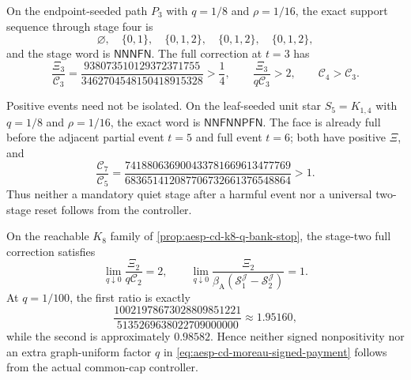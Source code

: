 \begin{proposition}
\label{prop:aesp-cd-p3-positive-signed-event}
On the endpoint-seeded path $P_3$ with $q=1/8$ and $\rho=1/16$, the exact
support sequence through stage four is
\begin{equation*}
 \varnothing,\quad\{0,1\},\quad\{0,1,2\},\quad
 \{0,1,2\},\quad\{0,1,2\},
\end{equation*}
and the stage word is $\mathsf N\mathsf N\mathsf N\mathsf F\mathsf N$.
The full correction at $t=3$ has
\begin{equation}
 \frac{\Xi_3}{\mathcal C_3}
 =\frac{938073510129372371755}{3462704548150418915328}
 >\frac14,
 \qquad
 \frac{\Xi_3}{q\mathcal C_3}>2,
 \qquad
 \mathcal C_4>\mathcal C_3.
 \label{eq:aesp-cd-p3-positive-signed-event}
\end{equation}

Positive events need not be isolated.  On the leaf-seeded unit star
$S_5=K_{1,4}$ with $q=1/8$ and $\rho=1/16$, the exact word is
$\mathsf N\mathsf N\mathsf F\mathsf N\mathsf N\mathsf P\mathsf F\mathsf N$.
The face is already full before the adjacent partial event $t=5$ and full
event $t=6$; both have positive $\Xi$, and
\begin{equation}
 \frac{\mathcal C_7}{\mathcal C_5}
 =\frac{741880636900433781669613477769}
 {683651412087706732661376548864}>1.
 \label{eq:aesp-cd-s5-adjacent-signed-stop}
\end{equation}
Thus neither a mandatory quiet stage after a harmful event nor a universal
two-stage reset follows from the controller.

On the reachable $K_8$ family of
\cref{prop:aesp-cd-k8-q-bank-stop}, the stage-two full correction satisfies
\begin{equation}
 \lim_{q\downarrow0}\frac{\Xi_2}{q\mathcal C_2}=2,
 \qquad
 \lim_{q\downarrow0}
 \frac{\Xi_2}{\beta_{\mathrm A}
 (\mathcal S_1^{\mathcal J}-\mathcal S_2^{\mathcal J})}=1.
 \label{eq:aesp-cd-k8-signed-sharpness}
\end{equation}
At $q=1/100$, the first ratio is exactly
\begin{equation*}
 \frac{10021978673028809851221}{5135269638022709000000}
 \approx1.95160,
\end{equation*}
while the second is approximately $0.98582$.  Hence neither signed
nonpositivity nor an extra graph-uniform factor $q$ in
\cref{eq:aesp-cd-moreau-signed-payment} follows from the actual common-cap
controller.
\end{proposition}

